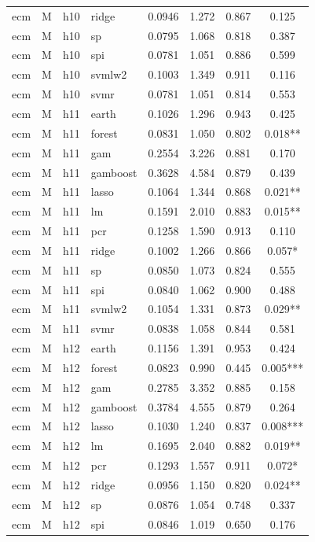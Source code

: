 \begin{ThreePartTable}
\begin{longtable}[t]{llclcccc}
ecm & M & h10 & ridge & 0.0946 & 1.272 & 0.867 & 0.125\\
ecm & M & h10 & sp & 0.0795 & 1.068 & 0.818 & 0.387\\
ecm & M & h10 & spi & 0.0781 & 1.051 & 0.886 & 0.599\\
ecm & M & h10 & svmlw2 & 0.1003 & 1.349 & 0.911 & 0.116\\
ecm & M & h10 & svmr & 0.0781 & 1.051 & 0.814 & 0.553\\
\addlinespace
ecm & M & h11 & earth & 0.1026 & 1.296 & 0.943 & 0.425\\
ecm & M & h11 & forest & 0.0831 & 1.050 & 0.802 & 0.018**\\
ecm & M & h11 & gam & 0.2554 & 3.226 & 0.881 & 0.170\\
ecm & M & h11 & gamboost & 0.3628 & 4.584 & 0.879 & 0.439\\
ecm & M & h11 & lasso & 0.1064 & 1.344 & 0.868 & 0.021**\\
ecm & M & h11 & lm & 0.1591 & 2.010 & 0.883 & 0.015**\\
ecm & M & h11 & pcr & 0.1258 & 1.590 & 0.913 & 0.110\\
ecm & M & h11 & ridge & 0.1002 & 1.266 & 0.866 & 0.057*\\
ecm & M & h11 & sp & 0.0850 & 1.073 & 0.824 & 0.555\\
ecm & M & h11 & spi & 0.0840 & 1.062 & 0.900 & 0.488\\
ecm & M & h11 & svmlw2 & 0.1054 & 1.331 & 0.873 & 0.029**\\
ecm & M & h11 & svmr & 0.0838 & 1.058 & 0.844 & 0.581\\
\addlinespace
ecm & M & h12 & earth & 0.1156 & 1.391 & 0.953 & 0.424\\
ecm & M & h12 & forest & 0.0823 & 0.990 & 0.445 & 0.005***\\
ecm & M & h12 & gam & 0.2785 & 3.352 & 0.885 & 0.158\\
ecm & M & h12 & gamboost & 0.3784 & 4.555 & 0.879 & 0.264\\
ecm & M & h12 & lasso & 0.1030 & 1.240 & 0.837 & 0.008***\\
ecm & M & h12 & lm & 0.1695 & 2.040 & 0.882 & 0.019**\\
ecm & M & h12 & pcr & 0.1293 & 1.557 & 0.911 & 0.072*\\
ecm & M & h12 & ridge & 0.0956 & 1.150 & 0.820 & 0.024**\\
ecm & M & h12 & sp & 0.0876 & 1.054 & 0.748 & 0.337\\
ecm & M & h12 & spi & 0.0846 & 1.019 & 0.650 & 0.176\\

\end{longtable}
\end{ThreePartTable}
